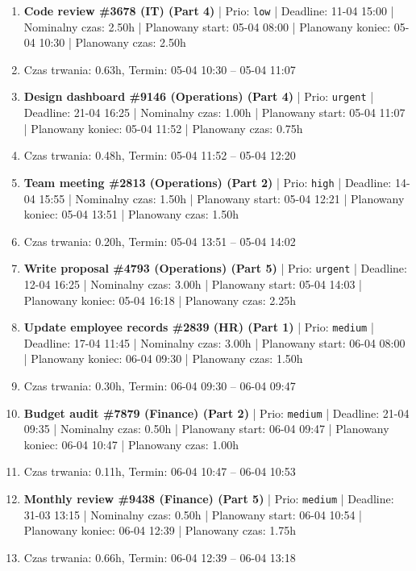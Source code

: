 {\begin{enumerate}
  \item [\textbf{14699}] \textbf{Code review \#3678 (IT) (Part 4)} | Prio: \texttt{low} | Deadline: 11-04 15:00 | Nominalny czas: 2.50h | Planowany start: 05-04 08:00 | Planowany koniec: 05-04 10:30 | Planowany czas: 2.50h
  \item [\textbf{PRZERWA}] Czas trwania: 0.63h, Termin: 05-04 10:30 -- 05-04 11:07
  \item [\textbf{14606}] \textbf{Design dashboard \#9146 (Operations) (Part 4)} | Prio: \texttt{urgent} | Deadline: 21-04 16:25 | Nominalny czas: 1.00h | Planowany start: 05-04 11:07 | Planowany koniec: 05-04 11:52 | Planowany czas: 0.75h
  \item [\textbf{PRZERWA}] Czas trwania: 0.48h, Termin: 05-04 11:52 -- 05-04 12:20
  \item [\textbf{14617}] \textbf{Team meeting \#2813 (Operations) (Part 2)} | Prio: \texttt{high} | Deadline: 14-04 15:55 | Nominalny czas: 1.50h | Planowany start: 05-04 12:21 | Planowany koniec: 05-04 13:51 | Planowany czas: 1.50h
  \item [\textbf{PRZERWA}] Czas trwania: 0.20h, Termin: 05-04 13:51 -- 05-04 14:02
  \item [\textbf{14600}] \textbf{Write proposal \#4793 (Operations) (Part 5)} | Prio: \texttt{urgent} | Deadline: 12-04 16:25 | Nominalny czas: 3.00h | Planowany start: 05-04 14:03 | Planowany koniec: 05-04 16:18 | Planowany czas: 2.25h
  \item [\textbf{14670}] \textbf{Update employee records \#2839 (HR) (Part 1)} | Prio: \texttt{medium} | Deadline: 17-04 11:45 | Nominalny czas: 3.00h | Planowany start: 06-04 08:00 | Planowany koniec: 06-04 09:30 | Planowany czas: 1.50h
  \item [\textbf{PRZERWA}] Czas trwania: 0.30h, Termin: 06-04 09:30 -- 06-04 09:47
  \item [\textbf{14644}] \textbf{Budget audit \#7879 (Finance) (Part 2)} | Prio: \texttt{medium} | Deadline: 21-04 09:35 | Nominalny czas: 0.50h | Planowany start: 06-04 09:47 | Planowany koniec: 06-04 10:47 | Planowany czas: 1.00h
  \item [\textbf{PRZERWA}] Czas trwania: 0.11h, Termin: 06-04 10:47 -- 06-04 10:53
  \item [\textbf{14656}] \textbf{Monthly review \#9438 (Finance) (Part 5)} | Prio: \texttt{medium} | Deadline: 31-03 13:15 | Nominalny czas: 0.50h | Planowany start: 06-04 10:54 | Planowany koniec: 06-04 12:39 | Planowany czas: 1.75h
  \item [\textbf{PRZERWA}] Czas trwania: 0.66h, Termin: 06-04 12:39 -- 06-04 13:18

\end{enumerate}}
